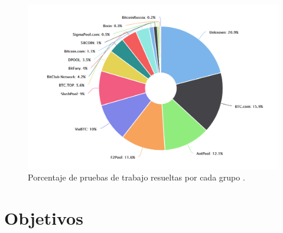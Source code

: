 \begin{figure}
	\centering
	\includegraphics[width=1\textwidth]{imagenes/minninpools.PNG}
	\caption{\label{fig1}Porcentaje de pruebas de trabajo resueltas por cada grupo \cite{blockchaininfo}.}
\end{figure}





\section{Objetivos}

